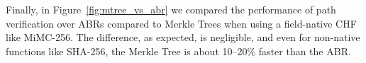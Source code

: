 Finally, in Figure~\ref{fig:mtree_vs_abr} we compared the performance of path verification over
ABRs compared to Merkle Trees when using a field-native CHF like MiMC-256.
The difference, as expected, is negligible, and even for non-native functions like SHA-256, the
Merkle Tree is about 10--20\% faster than the ABR\@.
